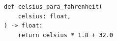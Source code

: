 \ifmostrarGabarito
\begin{verbatim}
def celsius_para_fahrenheit(
    celsius: float,
) -> float:
    return celsius * 1.8 + 32.0
\end{verbatim}

\fi
